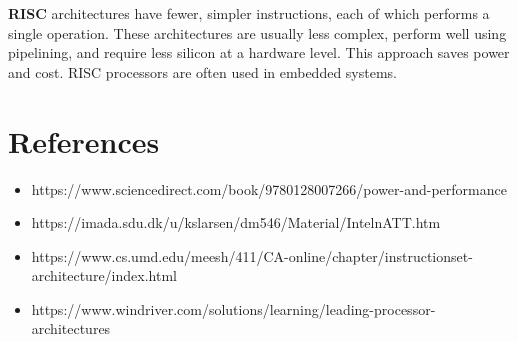 \textbf{RISC} architectures have fewer, simpler instructions, each of which performs a single operation. These architectures are usually less complex, perform well using pipelining, and require less silicon at a hardware level. This approach saves power and cost. RISC processors are often used in embedded systems.

\section{References}

\begin{itemize}
	\item https://www.sciencedirect.com/book/9780128007266/power-and-performance
	\item https://imada.sdu.dk/u/kslarsen/dm546/Material/IntelnATT.htm
	\item https://www.cs.umd.edu/meesh/411/CA-online/chapter/instructionset-
	architecture/index.html
	\item https://www.windriver.com/solutions/learning/leading-processor-architectures
\end{itemize}
